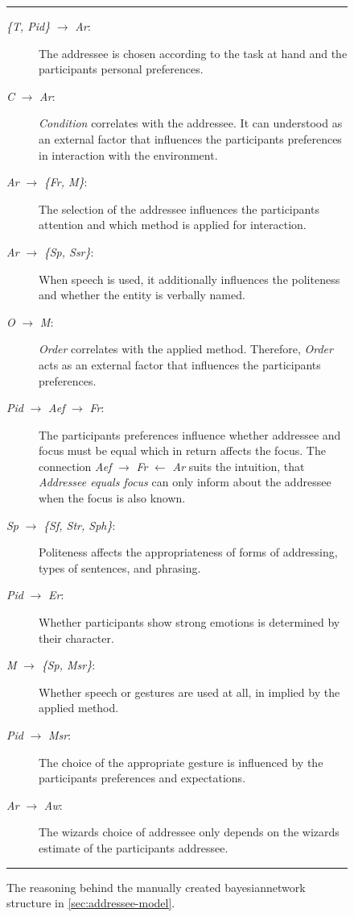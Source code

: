 \begin{figure}[!ht]
\hrule
\vspace{5pt}
\begin{description}
    \item[\emph{\{T, Pid\}} \(\rightarrow\) \emph{Ar}:] The \gls{addressee} is chosen according to the task at hand and the participants personal preferences.
    \item[\emph{C} \(\rightarrow\) \emph{Ar}:] \emph{Condition} correlates with the \gls{addressee}.
    It can understood as an external factor that influences the participants preferences in interaction with the environment.
    \item[\emph{Ar} \(\rightarrow\) \emph{\{Fr, M\}}:] The selection of the \gls{addressee} influences the participants attention and which method is applied for interaction.
    \item[\emph{Ar} \(\rightarrow\) \emph{\{Sp, Ssr\}}:] When speech is used, it additionally influences the politeness and whether the entity is verbally named.
    \item[\emph{O} \(\rightarrow\) \emph{M}:] \emph{Order} correlates with the applied method.
    Therefore, \emph{Order} acts as an external factor that influences the participants preferences.
    \item[\emph{Pid} \(\rightarrow\) \emph{Aef} \(\rightarrow\) \emph{Fr}:] The participants preferences influence whether \gls{addressee} and focus must be equal which in return affects the focus.
    The connection \emph{Aef} \(\rightarrow\) \emph{Fr} \(\leftarrow\) \emph{Ar} suits the intuition, that \emph{Addressee equals focus} can only inform about the \gls{addressee} when the focus is also known.
    \item[\emph{Sp} \(\rightarrow\) \emph{\{Sf, Str, Sph\}}:] Politeness affects the appropriateness of forms of addressing, types of sentences, and phrasing.
    \item[\emph{Pid} \(\rightarrow\) \emph{Er}:] Whether participants show strong emotions is determined by their character.
    \item[\emph{M} \(\rightarrow\) \emph{\{Sp, Msr\}}:] Whether speech or gestures are used at all, in implied by the applied method.
    \item[\emph{Pid} \(\rightarrow\) \emph{Msr}:] The choice of the appropriate gesture is influenced by the participants preferences and expectations.
    \item[\emph{Ar} \(\rightarrow\) \emph{Aw}:] The \glspl{wizard} choice of \gls{addressee} only depends on the \glspl{wizard} estimate of the participants \gls{addressee}.
    \end{description}
\hrule
    \caption[Reasoning behind BM.]{\label{app:bm-reasoning}
    The reasoning behind the manually created \gls{bayesiannetwork} structure in \vref{sec:addressee-model}.
    }
\end{figure}

